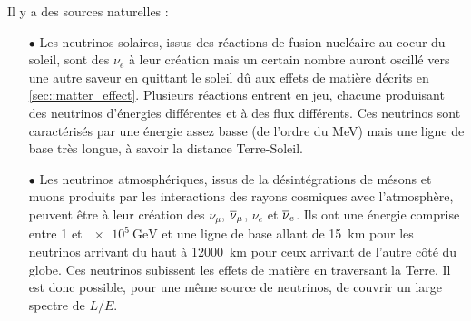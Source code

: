       Il y a des sources naturelles :
      \begin{itemize}
        \item[$\bullet$] Les neutrinos solaires, issus des réactions de fusion nucléaire au coeur du soleil, sont des $\nu_e$ à leur création mais un certain nombre auront oscillé vers une autre saveur en quittant le soleil dû aux effets de matière décrits en \autoref{sec::matter_effect}. Plusieurs réactions entrent en jeu, chacune produisant des neutrinos d'énergies différentes et à des flux différents. %
        Ces neutrinos sont caractérisés par une énergie assez basse (de l'ordre du \si{\mega\electronvolt}) mais une ligne de base très longue, à savoir la distance Terre-Soleil.
        \item[$\bullet$] Les neutrinos atmosphériques, issus de la désintégrations de mésons et muons produits par les interactions des rayons cosmiques avec l'atmosphère, peuvent être à leur création des $\nu_{\mu}$, $\overline{\nu}_{\mu}$, $\nu_e$ et $\overline{\nu}_e$. Ils ont une énergie comprise entre 1 et $\SI{e5}{\giga\electronvolt}$ et une ligne de base allant de \SI{15}{\kilo\meter} pour les neutrinos arrivant du haut à \SI{12000}{\kilo\meter} pour ceux arrivant de l'autre côté du globe. Ces neutrinos subissent les effets de matière en traversant la Terre. Il est donc possible, pour une même source de neutrinos, de couvrir un large spectre de $L/E$. %
      \end{itemize}

